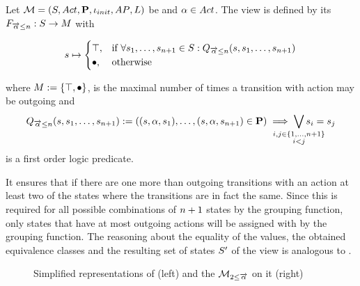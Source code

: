\documentclass[preview]{standalone}
\begin{document}
\begin{definition}
	Let $\chgph = \chgphtuple$ be \achgphN and $\action \in \actions$. The view \viewmaxoutaction is defined by its \grpfctN $\gfctmaxoutaction : \states \to \arbset$ with
	
	\[
	\state \mapsto
	\begin{cases}
			\group,				& \text{if } \forall \state_1, \dots, \state_{\numoutact+1} \in \states: \predmaxoutact \\
			\remelem,          	& \text{otherwise}
		\end{cases}
	\]
	
	where $\imggrp := \imggrpbinview$,
	is the maximal number of times a transition with action \action may be outgoing and 
	\[
	\predmaxoutact := ((\state, \action, \state_1), \dots, (\state, \action, \state_{\numoutact+1}) \in \trans) \implies \bigvee_{\mathclap{\substack{i,j \in \{1,\dots, \numoutact+1\} \\ i < j}}} \state_i = \state_j
	\]
	is a first order logic predicate.
	\label{def:viewmaxoutaction}
\end{definition}

It ensures that if there are one more than \numoutact outgoing transitions with an action \action at least two of the states where the transitions  are in fact the same. Since this is required for all possible combinations of $\numoutact + 1$ states by the grouping function, only states that have at most \numoutact outgoing actions will be assigned with \action by the grouping function. The reasoning about the equality of the \grpfctN values, the obtained equivalence classes and the resulting set of states $\states'$ of the view is analogous to \viewminoutaction.

\begin{figure}[h]
	\begin{minipage}{.5\textwidth}
		\hspace{5mm}
		
	\end{minipage}%
	\begin{minipage}{.5\textwidth}
		\hspace{5mm}
		
	\end{minipage}
	\caption{Simplified representations of \mdp (left) and the \viewN $\view[\pptyminoutact{2}{\outact}]$ on it (right)}
	\label{fig:outActMinAfter}  
\end{figure}
\end{document}
